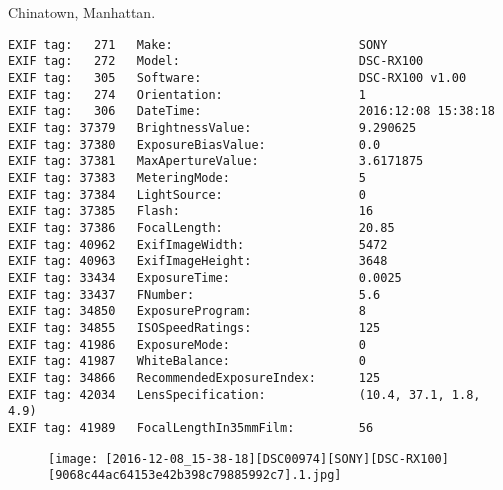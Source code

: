 \section{\protect{}}
\noindent Chinatown, Manhattan.
\noindent
\begin{lstlisting}
EXIF tag:   271   Make:                          SONY
EXIF tag:   272   Model:                         DSC-RX100
EXIF tag:   305   Software:                      DSC-RX100 v1.00
EXIF tag:   274   Orientation:                   1
EXIF tag:   306   DateTime:                      2016:12:08 15:38:18
EXIF tag: 37379   BrightnessValue:               9.290625
EXIF tag: 37380   ExposureBiasValue:             0.0
EXIF tag: 37381   MaxApertureValue:              3.6171875
EXIF tag: 37383   MeteringMode:                  5
EXIF tag: 37384   LightSource:                   0
EXIF tag: 37385   Flash:                         16
EXIF tag: 37386   FocalLength:                   20.85
EXIF tag: 40962   ExifImageWidth:                5472
EXIF tag: 40963   ExifImageHeight:               3648
EXIF tag: 33434   ExposureTime:                  0.0025
EXIF tag: 33437   FNumber:                       5.6
EXIF tag: 34850   ExposureProgram:               8
EXIF tag: 34855   ISOSpeedRatings:               125
EXIF tag: 41986   ExposureMode:                  0
EXIF tag: 41987   WhiteBalance:                  0
EXIF tag: 34866   RecommendedExposureIndex:      125
EXIF tag: 42034   LensSpecification:             (10.4, 37.1, 1.8, 4.9)
EXIF tag: 41989   FocalLengthIn35mmFilm:         56

\end{lstlisting}
\clearpage
\begin{figure}
\raggedleft
\texttt{[image: [2016-12-08\_15-38-18][DSC00974][SONY][DSC-RX100][9068c44ac64153e42b398c79885992c7].1.jpg]}
\end{figure}


\clearpage
